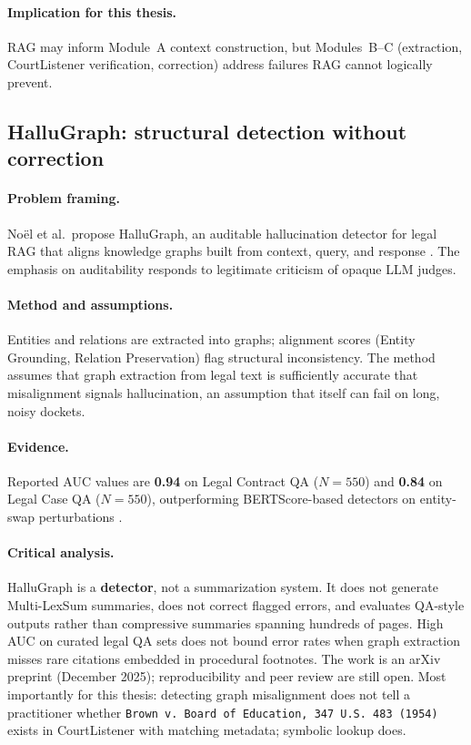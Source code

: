 \paragraph{Implication for this thesis.}
RAG may inform Module~A context construction, but Modules~B--C (extraction, CourtListener verification, correction) address failures RAG cannot logically prevent.

\subsection{HalluGraph: structural detection without correction}
\label{sec:lit-hallugraph}

\paragraph{Problem framing.}
No{\"e}l et al.\ propose HalluGraph, an auditable hallucination detector for legal RAG that aligns knowledge graphs built from context, query, and response \cite{noel2025hallugraph}. The emphasis on auditability responds to legitimate criticism of opaque LLM judges.

\paragraph{Method and assumptions.}
Entities and relations are extracted into graphs; alignment scores (Entity Grounding, Relation Preservation) flag structural inconsistency. The method assumes that graph extraction from legal text is sufficiently accurate that misalignment signals hallucination, an assumption that itself can fail on long, noisy dockets.

\paragraph{Evidence.}
Reported AUC values are \textbf{0.94} on Legal Contract QA ($N{=}550$) and \textbf{0.84} on Legal Case QA ($N{=}550$), outperforming BERTScore-based detectors on entity-swap perturbations \cite{noel2025hallugraph}.

\paragraph{Critical analysis.}
HalluGraph is a \textbf{detector}, not a summarization system. It does not generate Multi-LexSum summaries, does not correct flagged errors, and evaluates QA-style outputs rather than compressive summaries spanning hundreds of pages. High AUC on curated legal QA sets does not bound error rates when graph extraction misses rare citations embedded in procedural footnotes. The work is an arXiv preprint (December 2025); reproducibility and peer review are still open. Most importantly for this thesis: detecting graph misalignment does not tell a practitioner whether \texttt{Brown v. Board of Education, 347 U.S. 483 (1954)} exists in CourtListener with matching metadata; symbolic lookup does.

